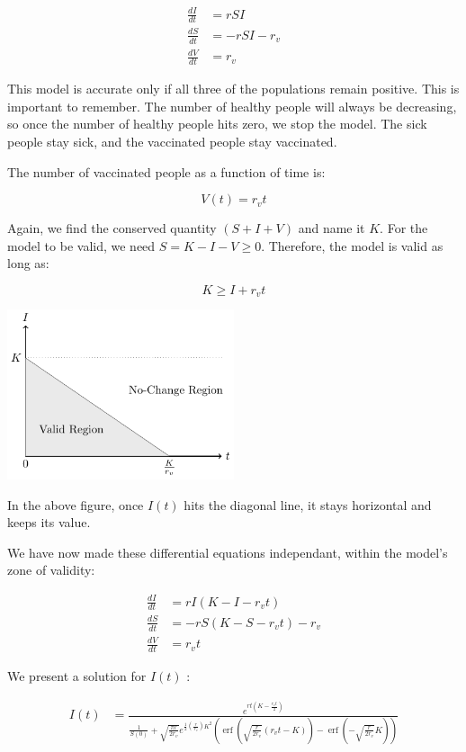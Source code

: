 \documentclass[titlepage]{article}
\DeclareMathOperator\erf{erf}
\begin{document}
\begin{align*}
\frac{dI}{dt} & = r S I \\
\frac{dS}{dt} & = - r S I - r_v \\
\frac{dV}{dt} & = r_v
\end{align*}

This model is accurate only if all three of the populations remain
	positive.
This is important to remember.
The number of healthy people will always be decreasing, so once
	the number of healthy people hits zero, we stop the model.
The sick people stay sick, and the vaccinated people stay vaccinated.

The number of vaccinated people as a function of time is:

\[ V(t) = r_v t \]

Again, we find the conserved quantity $\left( S + I + V \right)$ and
	name it $K$.
For the model to be valid, we need $S = K - I - V \geq 0$.
Therefore, the model is valid as long as:

\[ K \geq I + r_v t \]

\includegraphics[width=0.5\textwidth]{figures/admissible-region.pdf}

In the above figure, once $I(t)$ hits the diagonal line,
	it stays horizontal and keeps its value.

We have now made these differential equations independant,
	within the model's zone of validity:

\begin{align*}
\frac{dI}{dt} & = r I \left( K - I - r_v t \right)\\
\frac{dS}{dt} & = - r S \left( K - S - r_v t \right) - r_v \\
\frac{dV}{dt} & = r_v t
\end{align*}

We present a solution for $I(t)$ \cite{walph}:

\begin{align}
I(t) & =
	\frac{e^{ r t (K - \frac{ r_v t}{2})}}
	{\frac{1}{S(0)} + \sqrt{\frac{\pi r}{2 r_v}}
		e^{\frac12 \left( \frac{r}{r_v} \right) K^2}
		\left(\erf\left(  \sqrt{\frac{r}{2 r_v}} (r_v t - K ) \right)
			- \erf\left( - \sqrt{\frac{r}{2 r_v}} K \right) \right)}
\end{align}
\end{document}
